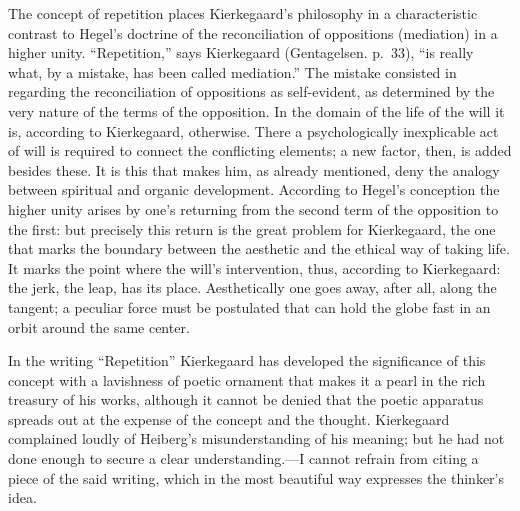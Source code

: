 \documentclass[12pt,a4paper]{book}
\newcommand{\opage}[1]{\marginnote{\footnotesize\textit{[#1]}}}
\begin{document}
The concept of repetition places Kierkegaard's philosophy in a
characteristic contrast to Hegel's doctrine of the reconciliation of
oppositions (mediation) in a higher unity. ``Repetition,'' says Kierkegaard
(Gentagelsen. p.~33), ``is really what, by a mistake, has been called
mediation.'' The mistake consisted in regarding the reconciliation of
oppositions as self-evident, as determined by the very nature of the terms
of the opposition. In the domain of the life of the will it is, according
to Kierkegaard, otherwise. There a psychologically inexplicable act of will
is required to connect the conflicting elements; a new factor, then, is
added
\opage{96}besides these. It is this that makes him, as already mentioned,
deny the analogy between spiritual and organic development. According to
Hegel's conception the higher unity arises by one's returning from the
second term of the opposition to the first: but precisely this return is
the great problem for Kierkegaard, the one that marks the boundary between
the aesthetic and the ethical way of taking life. It marks the point where
the will's intervention, thus, according to Kierkegaard: the jerk, the
leap, has its place. Aesthetically one goes away, after all, along the
tangent; a peculiar force must be postulated that can hold the globe fast
in an orbit around the same center.

In the writing ``Repetition'' Kierkegaard has developed the significance of
this concept with a lavishness of poetic ornament that makes it a pearl in
the rich treasury of his works, although it cannot be denied that the
poetic apparatus spreads out at the expense of the concept and the
thought. Kierkegaard complained loudly of Heiberg's misunderstanding of his
meaning; but he had not done enough to secure a clear understanding.---I
cannot refrain from citing a piece of the said writing, which in the most
beautiful way expresses the thinker's idea.
\end{document}
